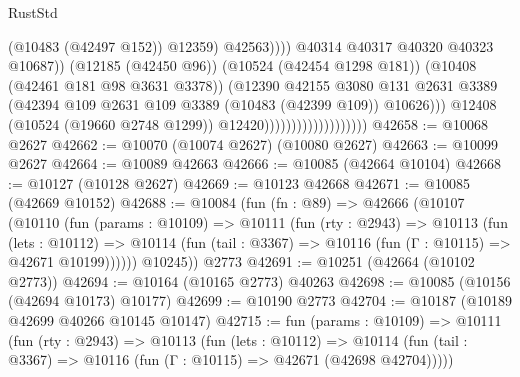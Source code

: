 \begin{lexlean}{RustStd}
\begin{coremodule}
                                                          (@10483 (@42497 @152))
                                                          @12359)
                                                        @42563))))
                                                @40314
                                                @40317
                                                @40320
                                                @40323
                                                @10687))
                                            (@12185 (@42450 @96))
                                            (@10524 (@42454 @1298 @181))
                                            (@10408 (@42461 @181 @98 @3631 @3378))
                                            (@12390
                                              @42155
                                              @3080
                                              @131
                                              @2631
                                              @3389
                                              (@42394
                                                @109
                                                @2631
                                                @109
                                                @3389
                                                (@10483 (@42399 @109))
                                                @10626)))
                                          @12408
                                          (@10524 (@19660 @2748 @1299))
                                          @12420)))))))))))))))))))
@42658 := @10068 @2627
@42662 := @10070 (@10074 @2627) (@10080 @2627)
@42663 := @10099 @2627
@42664 := @10089 @42663
@42666 := @10085 (@42664 @10104)
@42668 := @10127 (@10128 @2627)
@42669 := @10123 @42668
@42671 := @10085 (@42669 @10152)
@42688 := @10084
    (fun (fn : @89) =>
    @42666
      (@10107
        (@10110
          (fun (params : @10109) =>
          @10111
            (fun (rty : @2943) =>
            @10113
              (fun (lets : @10112) =>
              @10114 (fun (tail : @3367) => @10116 (fun (Γ : @10115) => @42671 @10199))))))
        @10245))
    @2773
@42691 := @10251 (@42664 (@10102 @2773))
@42694 := @10164 (@10165 @2773) @40263
@42698 := @10085 (@10156 (@42694 @10173) @10177)
@42699 := @10190 @2773
@42704 := @10187 (@10189 @42699 @40266 @10145 @10147)
@42715 := fun (params : @10109) =>
  @10111
    (fun (rty : @2943) =>
    @10113
      (fun (lets : @10112) =>
      @10114 (fun (tail : @3367) => @10116 (fun (Γ : @10115) => @42671 (@42698 @42704)))))

\end{coremodule}
\end{lexlean}
